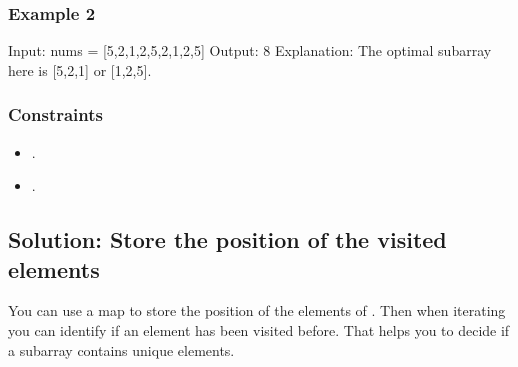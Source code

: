 \documentclass[letterpaper,12pt,english]{book}
\begin{document}
\subsubsection{Example 2}
\label{\detokenize{Hash_Table/03_H_1695_Maximum_Erasure_Value:example-2}}
\begin{sphinxVerbatim}[commandchars=\\\{\}]
Input: nums = [5,2,1,2,5,2,1,2,5]
Output: 8
Explanation: The optimal subarray here is [5,2,1] or [1,2,5].
\end{sphinxVerbatim}


\subsubsection{Constraints}
\label{\detokenize{Hash_Table/03_H_1695_Maximum_Erasure_Value:constraints}}\begin{itemize}
\item {} 
\sphinxAtStartPar
{}.

\item {} 
\sphinxAtStartPar
{}.

\end{itemize}


\subsection{Solution: Store the position of the visited elements}
\label{\detokenize{Hash_Table/03_H_1695_Maximum_Erasure_Value:solution-store-the-position-of-the-visited-elements}}
\sphinxAtStartPar
You can use a map to store the position of the elements of . Then when iterating  you can identify if an element has been visited before. That helps you to decide if a subarray contains unique elements.
\end{document}
